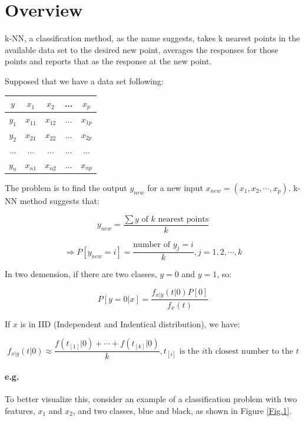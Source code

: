 \documentclass{article}
\begin{document}
\section{Overview}{
    k-NN, a classification method, as the name suggests, takes k nearest points in the available data set to the desired new point, averages the responses for those points and reports that as the response at the new point. 

    Supposed that we have a data set following:

    \begin{center}{
        \begin{tabular}{c|c c c c }

            $y$ & $x_1$ & $x_2$ & ... & $x_p$ \\
            \hline
            $y_1$ & $x_{11}$ & $x_{12}$ & ... & $x_{1p}$ \\
            
            $y_2$ & $x_{21}$ & $x_{22}$ & ... & $x_{2p}$ \\
            
            ... & ... & ... & ... & ... \\
            
            $y_n$ & $x_{n1}$ & $x_{n2}$ & ... & $x_{np}$ \\
            
        \end{tabular}
    }
    \end{center}

    The problem is to find the output $y_{new}$ for a new input \(x_{new}=(x_1,x_2, \cdots,x_p)\). k-NN method suggests that:

    \[y_{new}=\frac{\sum y \text{ of } k \text{ nearest points}}{k}\]

    \[\Rightarrow P[y_{new}=i]=\frac{\text{number of } y_j=i}{k}, j=1,2,\cdots,k\]

    In two demension, if there are two classes, \(y=0\) and \(y=1\), so:

    \[P[y=0|x]=\frac{f_{x|y}(t|0)P[0]}{f_x(t)}\]

    If $x$ is in IID (Independent and Indentical distribution), we have:

    \[f_{x|y}(t|0)\approx \frac{f(t_{[1]}|0)+\cdots+f(t_{[k]}|0)}{k}, t_{[i]} \text{ is the $i$th closest number to the $t$}\]

    \paragraph{e.g. }{
        To better visualize this, consider an example of a classification problem with two features, $x_1$ and $x_2$, and two classes, blue and black, as shown in Figure \ref{Fig.1}. 

}}
\end{document}
